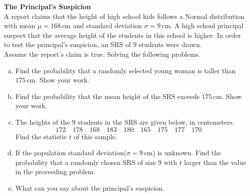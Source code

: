 \documentclass[a4paper, 12pt,twoside]{book}
\begin{document}
    \colorbox{champagne}{\parbox{\textwidth}{
    \textbf{The Principal's Suspicion}\vspace{0.3cm}\\
    A report claims that the height of high school kids follows a Normal distribution with mean $\mu = 168\, \text{cm}$ and standard deviation $\sigma = 9\, \text{cm}$. A high school principal suspect that the average height of the students in this school is higher. In order to test the principal's suspicion, an SRS of 9 students were drawn.\vspace{0.3cm}\\
    Assume the report's claim is true. Solving the following problems. 
    \begin{enumerate}[(a)]
       \item  Find the probability that a randomly selected young woman is taller than $175\, \text{cm}$. Show your work.
       \item Find the probability that the mean height of the SRS  exceeds $175\, \text{cm}$. Show your work.
       \item  The heights of the 9 students in the SRS are given below, in centemeters.
$$172\quad178\quad168\quad183\quad180\quad165\quad175\quad177\quad170\quad$$
Find the statistic $t$ of this sample.
   \item If the population standard deviation($\sigma = 9\, \text{cm}$) is unknown. Find the probability that a randomly chosen SRS of size 9 with $t$ larger than the value in the proceeding problem.
   \item What can you say about the principal's suspicion.
    \end{enumerate}
    }} 
    \newpage
\end{document}
